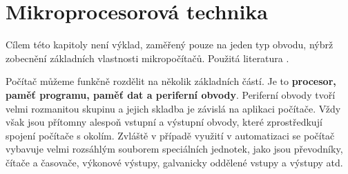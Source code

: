 \setchaptertoc
\chapter{Mikroprocesorová technika}\label{ces:IchapIV}
  
    Cílem této kapitoly není výklad, zaměřený pouze na jeden typ obvodu, nýbrž zobecnění základních 
    vlastnosti mikropočítačů. Použitá literatura \cite{Pinker2004}.

    Počítač můžeme funkčně rozdělit na několik základních částí. Je to \textbf{procesor, paměť
    programu, paměť dat a periferní obvody}. Periferní obvody tvoří velmi rozmanitou skupinu a
    jejich skladba je závislá na aplikaci počítače. Vždy však jsou přítomny alespoň vstupní a
    výstupní obvody, které zprostředkují spojení počítače s okolím. Zvláště v případě využití v
    automatizaci se počítač vybavuje velmi rozsáhlým souborem speciálních jednotek, jako jsou
    převodníky, čítače a časovače, výkonové výstupy, galvanicky oddělené vstupy a výstupy atd.

    
